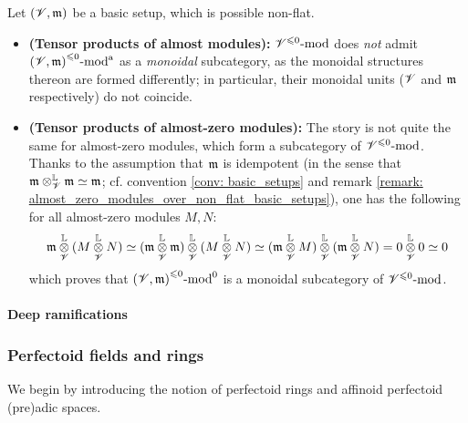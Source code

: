                     \begin{remark} \label{remark: incompatible_monoidal_structures_almost_modules}
                        Let $(\mathscr{V}, \mathfrak{m})$ be a basic setup, which is possible non-flat.
                        \begin{itemize}
                            \item \textbf{(Tensor products of almost modules):} ${\mathscr{V}}^{\leqslant 0}\text{-}\mathrm{mod}$ does \textit{not} admit ${(\mathscr{V}, \mathfrak{m})}^{\leqslant 0}\text{-}\mathrm{mod}^{\mathrm{a}}$ as a \textit{monoidal} subcategory, as the monoidal structures thereon are formed differently; in particular, their monoidal units ($\mathscr{V}$ and $\mathfrak{m}$ respectively) do not coincide.
                            \item \textbf{(Tensor products of almost-zero modules):} The story is not quite the same for almost-zero modules, which form a subcategory of ${\mathscr{V}}^{\leqslant 0}\text{-}\mathrm{mod}$. Thanks to the assumption that $\mathfrak{m}$ is idempotent (in the sense that $\m \tensor_{\scrV}^{\L} \m \cong \m$; cf. convention \ref{conv: basic_setups} and remark \ref{remark: almost_zero_modules_over_non_flat_basic_setups}), one has the following for all almost-zero modules $M, N$:
                                $$\m \tensor_{\scrV}^{\L} (M \tensor_{\scrV}^{\L} N) \cong (\m \tensor_{\scrV}^{\L} \m) \tensor_{\scrV}^{\L} (M \tensor_{\scrV}^{\L} N) \cong (\m \tensor_{\scrV}^{\L} M) \tensor_{\scrV}^{\L} (\m \tensor_{\scrV}^{\L} N) = 0 \tensor_{\scrV}^{\L} 0 \cong 0$$
                            which proves that ${(\mathscr{V}, \mathfrak{m})}^{\leqslant 0}\text{-}\mathrm{mod}^0$ is a monoidal subcategory of ${\mathscr{V}}^{\leqslant 0}\text{-}\mathrm{mod}$. 
                        \end{itemize}
                    \end{remark}
                    
                    \begin{definition} \label{def: almost_flatness}
                    
                    \end{definition}
                
                \paragraph{Deep ramifications}
        
            \subsubsection{Perfectoid fields and rings}
                We begin by introducing the notion of perfectoid rings and affinoid perfectoid (pre)adic spaces.
            
